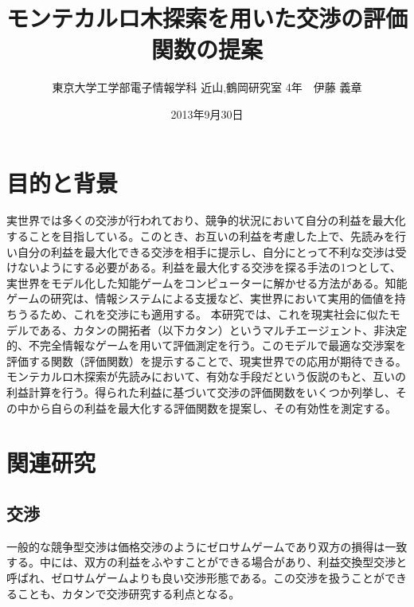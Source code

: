 \documentclass[a4, 10pt,dvipdfmx,twocolumn]{jsarticle}
\title{モンテカルロ木探索を用いた交渉の評価関数の提案}
\author{東京大学工学部電子情報学科 近山,鶴岡研究室 4年　伊藤 義章}
\date{2013年9月30日}
\begin{document}



\newpage
\maketitle


\section{目的と背景}
実世界では多くの交渉が行われており、競争的状況において自分の利益を最大化することを目指している。このとき、お互いの利益を考慮した上で、先読みを行い自分の利益を最大化できる交渉を相手に提示し、自分にとって不利な交渉は受けないようにする必要がある。利益を最大化する交渉を探る手法の1つとして、実世界をモデル化した知能ゲームをコンピューターに解かせる方法がある。知能ゲームの研究は、情報システムによる支援など、実世界において実用的価値を持ちうるため、これを交渉にも適用する。
本研究では、これを現実社会に似たモデルである、カタンの開拓者（以下カタン）というマルチエージェント、非決定的、不完全情報なゲームを用いて評価測定を行う。このモデルで最適な交渉案を評価する関数（評価関数）を提示することで、現実世界での応用が期待できる。モンテカルロ木探索が先読みにおいて、有効な手段だという仮説のもと、互いの利益計算を行う。得られた利益に基づいて交渉の評価関数をいくつか列挙し、その中から自らの利益を最大化する評価関数を提案し、その有効性を測定する。
\section{関連研究}
\subsection{交渉}
一般的な競争型交渉は価格交渉のようにゼロサムゲームであり双方の損得は一致する。中には、双方の利益をふやすことができる場合があり、利益交換型交渉と呼ばれ、ゼロサムゲームよりも良い交渉形態である。この交渉を扱うことができることも、カタンで交渉研究する利点となる。
\end{document}
